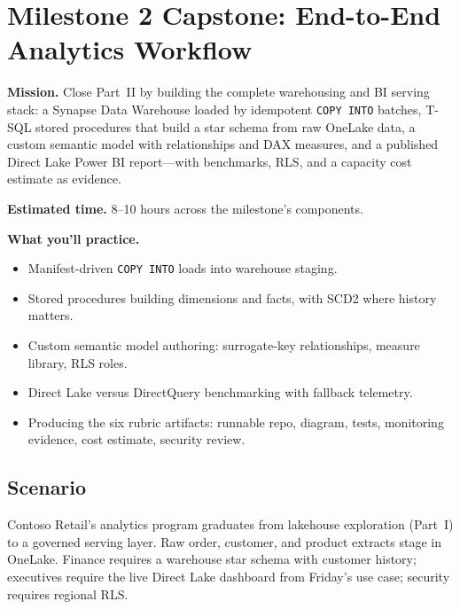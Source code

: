\section{Milestone 2 Capstone: End-to-End Analytics Workflow}\label{sec:ch8-capstone}

\begin{capstonebox}
\textbf{Mission.} Close Part~II by building the complete warehousing and BI serving stack: a Synapse Data Warehouse loaded by idempotent \texttt{COPY INTO} batches, T-SQL stored procedures that build a star schema from raw OneLake data, a custom semantic model with relationships and DAX measures, and a published Direct Lake Power BI report---with benchmarks, RLS, and a capacity cost estimate as evidence.

\textbf{Estimated time.} 8--10 hours across the milestone's components.

\textbf{What you'll practice.}
\begin{itemize}
    \item Manifest-driven \texttt{COPY INTO} loads into warehouse staging.
    \item Stored procedures building dimensions and facts, with SCD2 where history matters.
    \item Custom semantic model authoring: surrogate-key relationships, measure library, RLS roles.
    \item Direct Lake versus DirectQuery benchmarking with fallback telemetry.
    \item Producing the six rubric artifacts: runnable repo, diagram, tests, monitoring evidence, cost estimate, security review.
\end{itemize}
\end{capstonebox}

\subsection*{Scenario}
Contoso Retail's analytics program graduates from lakehouse exploration (Part~I) to a governed serving layer. Raw order, customer, and product extracts stage in OneLake. Finance requires a warehouse star schema with customer history; executives require the live Direct Lake dashboard from Friday's use case; security requires regional RLS.

